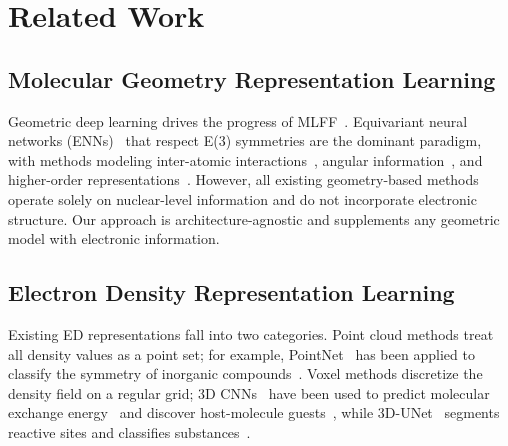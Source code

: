 \section{Related Work}
\label{sec:RelatedWork}

\subsection{Molecular Geometry Representation Learning}

Geometric deep learning drives the progress of MLFF~\cite{liu2022spherical,wang2024enhancing}. Equivariant neural networks (ENNs)~\cite{satorras2021n} that respect E(3) symmetries are the dominant paradigm, with methods modeling inter-atomic interactions~\cite{schutt2017schnet,liao2023equiformer}, angular information~\cite{gasteiger2020directional,liu2022spherical,gasteiger2021gemnet}, and higher-order representations~\cite{liao2024equiformerv2,passaro2023reducing,wang2024enhancing}. However, all existing geometry-based methods operate solely on nuclear-level information and do not incorporate electronic structure. Our approach is architecture-agnostic and supplements any geometric model with electronic information.

\subsection{Electron Density Representation Learning}

Existing ED representations fall into two categories. Point cloud methods treat all density values as a point set; for example, PointNet~\cite{qi2017pointnet} has been applied to classify the symmetry of inorganic compounds~\cite{kim2024deep}. Voxel methods discretize the density field on a regular grid; 3D CNNs~\cite{liu2015sparse} have been used to predict molecular exchange energy~\cite{gong2023incorporation} and discover host-molecule guests~\cite{parrilla2024electron}, while 3D-UNet~\cite{cciccek20163d} segments reactive sites and classifies substances~\cite{singh2024classification}.

